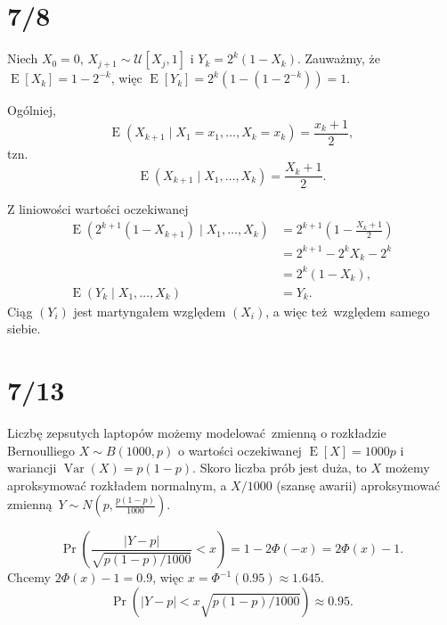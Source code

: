\documentclass[a4paper, 12pt]{article}
\title{}
\author{Wiktor Kuchta}
\date{\vspace{-4ex}}
\DeclareMathOperator{\EX}{E}
\DeclareMathOperator{\Var}{Var}
\begin{document}
\maketitle

\section*{7/8}
Niech $X_0=0$, $X_{j+1} \sim \mathcal{U}[X_{j}, 1]$ i $Y_k=2^k(1-X_k)$.
Zauważmy, że $\EX[X_k] = 1 - 2^{-k}$,
więc $\EX[Y_k] = 2^k(1-(1-2^{-k}))=1$.

Ogólniej,
$$\EX(X_{k+1} \mid X_1=x_1, …, X_k=x_k) = \frac{x_k+1}{2},$$ tzn.
$$\EX(X_{k+1} \mid X_1, …, X_k) = \frac{X_k+1}{2}.$$

Z liniowości wartości oczekiwanej
\begin{align*}
	\EX(2^{k+1}(1-X_{k+1}) \mid X_1,…,X_k)
		&= 2^{k+1}\left(1-\frac{X_k+1}{2}\right) \\
		&= 2^{k+1} - 2^kX_k - 2^k \\
		&= 2^k(1-X_k),\\
	\EX(Y_k \mid X_1,…,X_k) &= Y_k.
\end{align*}
Ciąg $(Y_i)$ jest martyngałem względem $(X_i)$,
a więc też względem samego siebie.

\section*{7/13}
Liczbę zepsutych laptopów możemy modelować zmienną o rozkładzie Bernoulliego
$X \sim B(1000, p)$ o wartości oczekiwanej $\EX[X] = 1000p$ i wariancji $\Var(X) = p(1-p)$.
Skoro liczba prób jest duża, to $X$ możemy aproksymować rozkładem normalnym,
a $X/1000$ (szansę awarii) aproksymować zmienną $Y \sim N(p, \frac{p(1-p)}{1000})$.

$$\Pr(\frac{|Y-p|}{\sqrt{p(1-p)/1000}} < x) = 1 - 2Φ(-x) = 2Φ(x)-1.$$
Chcemy $2Φ(x)-1 = 0.9$, więc $x = Φ^{-1}(0.95) ≈ 1.645$.
$$\Pr(|Y-p| < x{\sqrt{p(1-p)/1000}}) ≈ 0.95.$$

\iffalse


Wstawiając pomiar $p=0.016$ otrzymujemy
$x{\sqrt{p(1-p)/1000}} ≈ 0.00653$,
więc przedział ufności to $0.016 ± 0.00653$.

\fi
\end{document}
